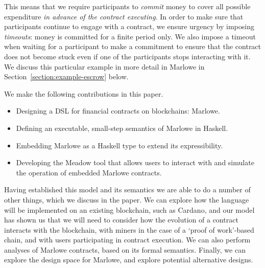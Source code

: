 \documentclass[runningheads]{llncs}
\begin{document}
This means that we require participants to \emph{commit} money to cover all possible expenditure \emph{in advance of the 
contract executing}. In order to make sure that participants continue to engage with a contract, we ensure urgency by 
imposing \emph{timeouts}: money is committed for a finite period only. We also impose a timeout when  waiting for a participant to make a 
commitment to ensure that the contract does not become stuck even if one of the 
participants stops interacting with it. We discuss this particular example in more detail in Marlowe in Section~\ref{section:example-escrow} below.

We make the following contributions in this paper.
\begin{itemize}
\item
Designing a DSL for financial contracts on blockchains: Marlowe.
\item
Defining an executable, small-step semantics of Marlowe in Haskell.
\item 
Embedding Marlowe as a Haskell  type to extend its expressibility.
\item
Developing the Meadow tool that allows users to interact with and simulate the operation of embedded Marlowe contracts. 
\end{itemize}
Having established this model and its semantics we are able to do a number of other things, which we discuss in the paper. We can explore how the language will be implemented on an existing blockchain, such as Cardano, and our model has shown us that we will need to consider how the evolution of a contract interacts with the blockchain, with miners in the case of a `proof of work'-based chain, and with users participating in contract execution. We can also perform analyses of Marlowe contracts, based on its formal semantics. Finally, we can explore the design space for Marlowe, and explore potential alternative designs.


%
 
\end{document}
